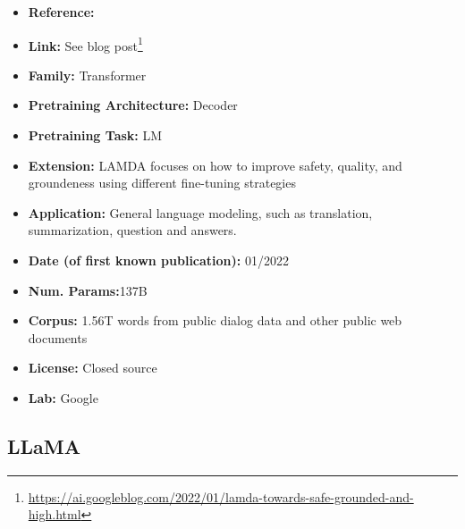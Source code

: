 \documentclass{article}
\begin{document}
            \begin{itemize}
                \item \textbf{Reference:} 
                \item \textbf{Link:} See blog post\footnote{\url{https://ai.googleblog.com/2022/01/lamda-towards-safe-grounded-and-high.html}}
                \item \textbf{Family:} Transformer 
                \item \textbf{Pretraining Architecture:} Decoder
                \item \textbf{Pretraining Task:} LM
                \item \textbf{Extension:} LAMDA focuses on how to improve safety, quality, and groundeness using different fine-tuning strategies  
                \item \textbf{Application:} General language modeling, such as translation, summarization, question and answers.
                \item \textbf{Date (of first known publication):} 01/2022
                \item \textbf{Num. Params:}137B
                \item \textbf{Corpus:} 1.56T words from public dialog data and other public web documents
                \item \textbf{License:} Closed source
                \item \textbf{Lab:} Google
            \end{itemize}
            
\subsection{LLaMA}
\end{document}
